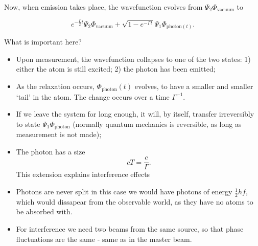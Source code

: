  Now, when emission takes place, the wavefunction evolves from $ \Psi_2\Phi_{\text{vacuum}} $ to
 
 \begin{equation}\label{key}
 	e^{-\frac{\Gamma}{2}t}\Psi_2\Phi_{\text{vacuum}} + \sqrt{1-e^{-\Gamma t}}\Psi_1\Phi_{\text{photon}(t)}.
 	 \end{equation}
 
 What is important here?
 \begin{itemize}
 	\item Upon measurement, the wavefunction collapses to one of the two states: 1) either the atom is still excited; 2) the photon has been emitted;
 	\item As the relaxation occurs, $ \Phi_{\text{photon}}(t) $ evolves, to have a smaller and smaller `tail' in the atom. The change occurs over a time $ \Gamma^{-1} $.
 	\item If we leave the system for long enough, it will, by itself, transfer irreversibly to state $ \Psi_1\Phi_\text{photon} $ (normally quantum mechanics is reversible, as long as measurement is not made);
 	\item The photon has a size
 	\begin{equation}\label{key}
 		cT = \frac{c}{\Gamma}.
 	\end{equation}
 	\noindent This extension explains interference effects
 	\item Photons are never split \ra in this case we would have photons of energy $ \frac{1}{2}hf $, which would dissapear from the observable world, as they have no atoms to be absorbed with.
 	\item For interference we need two beams from the same source, so that phase fluctuations are the same - same as in the master beam.


\end{itemize}
